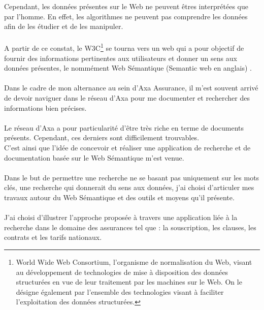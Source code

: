 \documentclass[12pt, a4paper, oneside]{book}
\begin{document}
Cependant, les données présentes sur le Web ne peuvent êtres interprétées que par l'homme. En effet, les algorithmes ne peuvent pas comprendre les données afin de les étudier et de les manipuler.
\paragraph{}
A partir de ce constat, le W3C\footnote{World Wide Web Consortium, l’organisme de normalisation du Web, visant au développement de technologies de mise à disposition des données structurées en vue de leur traitement par les machines sur le Web. On le désigne également par l’ensemble des technologies visant à faciliter l’exploitation des données structurées.} se tourna vers un web qui a pour objectif de fournir des informations pertinentes aux utilisateurs et donner un sens aux données présentes, le nommément Web Sémantique (Semantic web en anglais) \citep{web}.
\paragraph{}
Dans le cadre de mon alternance au sein d'Axa Assurance, il m'est souvent arrivé de devoir naviguer dans le réseau d'Axa pour me documenter et rechercher des informations bien précises.
\paragraph{}

Le réseau d'Axa a pour particularité d'être très riche en terme de documents présents.
Cependant, ces derniers sont difficilement trouvables.\\


C'est ainsi que l'idée de concevoir et réaliser une application de recherche et de documentation basée sur le Web Sémantique m'est venue.


\paragraph{}
Dans le but de permettre une recherche ne se basant pas uniquement sur les mots clés, une recherche qui donnerait du sens aux données, j'ai choisi d'articuler mes travaux autour du Web Sémantique et des outils et moyens qu'il présente. 

\paragraph{}
J'ai choisi d'illustrer l'approche proposée à travers une application liée à la recherche dans le domaine des assurances tel que : la souscription, les clauses, les contrats et les tarifs nationaux.  
\end{document}
